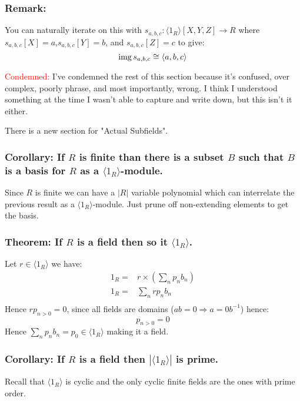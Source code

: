 \subsubsection{Remark:}
You can naturally iterate on this with $s_{a,b,c}: \langle 1_R \rangle[X,Y,Z] \rightarrow R$ where $s_{a,b,c}[X] = a$,$s_{a,b,c}[Y] = b$, and $s_{a,b,c}[Z] = c$ to give:
\[\operatorname{img} s_{a,b,c} \cong \langle a,b,c \rangle\]

\textcolor{red}{Condemned:} I've condemned the rest of this section because it's confused, over complex, poorly phrase, and most importantly, wrong. 
I think I understood something at the time I wasn't able to capture and write down, 
but this isn't it either.

There is a new section for "Actual Subfields".

\subsubsection{Corollary: If $R$ is finite than there is a subset $B$ such that $B$ is a basis for $R$ as a $\langle 1_R \rangle$-module.}
Since $R$ is finite we can have a $|R|$ variable polynomial which can interrelate the previous result as a $\langle 1_R \rangle$-module.
Just prune off non-extending elements to get the basis.

\subsubsection{Theorem: If $R$ is a field then so it $\langle 1_R \rangle$.}
Let $r\in\langle 1_R \rangle$ we have:
\begin{equation*}
\begin{aligned}
	1_R =& r\times\left(\sum_np_nb_n\right)\\
	1_R =& \sum_nrp_nb_n\\
\end{aligned}
\end{equation*}
Hence $rp_{n>0} = 0$, 
since all fields are domains ($ab=0\Rightarrow a=0b^{-1}$) hence:
\[p_{n>0} = 0\]
Hence $\sum_np_nb_n = p_0 \in \langle 1_R \rangle$ making it a field.

\subsubsection{Corollary: If $R$ is a field then $|\langle 1_R \rangle|$ is prime.}
Recall that $\langle 1_R \rangle$ is cyclic and the only cyclic finite fields are the ones with prime order.

